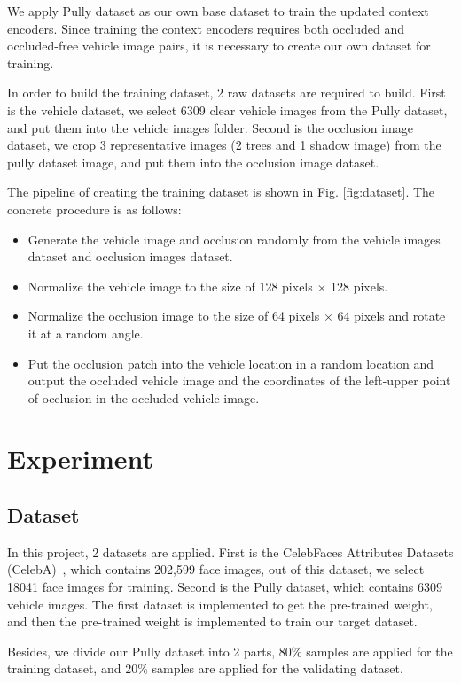 We apply Pully dataset as our own base dataset to train the updated context encoders. Since training the context encoders requires both occluded and occluded-free vehicle image pairs, it is necessary to create our own dataset for training.

In order to build the training dataset, 2 raw datasets are required to build. First is the vehicle dataset, we select 6309 clear vehicle images from the Pully dataset, and put them into the vehicle images folder. Second is the occlusion image dataset, we crop 3 representative images (2 trees and 1 shadow image) from the pully dataset image, and put them into the occlusion image dataset.

The pipeline of creating the training dataset is shown in Fig. \ref{fig:dataset}. The concrete procedure is as follows:
\begin{itemize}
    \item Generate the vehicle image and occlusion randomly from the vehicle images dataset and occlusion images dataset.
    \item Normalize the vehicle image to the size of 128 pixels $\times$ 128 pixels.
    \item Normalize the occlusion image to the size of 64 pixels $\times$ 64 pixels and rotate it at a random angle.
    \item Put the occlusion patch into the vehicle location in a random location and output the occluded vehicle image and the coordinates of the left-upper point of occlusion in the occluded vehicle image.
\end{itemize}
    

\section{Experiment}
\subsection{Dataset}
In this project, 2 datasets are applied. First is the CelebFaces Attributes Datasets (CelebA)\ \cite{7410776}, which contains 202,599 face images, out of this dataset, we select 18041 face images for training. Second is the Pully dataset, which contains 6309 vehicle images. The first dataset is implemented to get the pre-trained weight, and then the pre-trained weight is implemented to train our target dataset.

Besides, we divide our Pully dataset into 2 parts, 80\% samples are applied for the training dataset, and 20\% samples are applied for the validating dataset.

